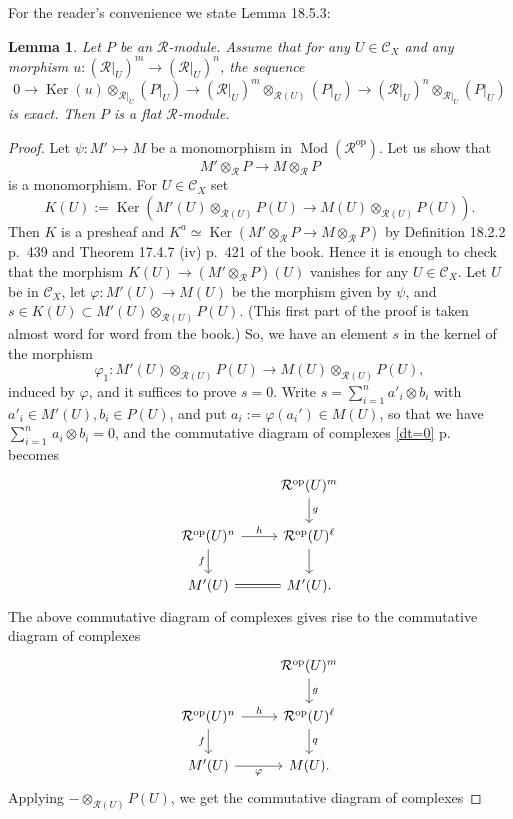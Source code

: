 \documentclass[12pt]{article}%
\newtheorem{lem}[thm]{Lemma}
\theoremstyle{remark}
\theoremstyle{definition}
\newcommand{\cc}{\mathcal}
\newcommand{\C}{\mathcal C}
\newcommand{\pp}{\varphi}
\newcommand{\mono}{\rightarrowtail}%
\DeclareMathOperator{\Ker}{Ker}
\DeclareMathOperator{\Mod}{Mod}
\DeclareMathOperator{\op}{op}
\begin{document}
For the reader's convenience we state Lemma 18.5.3: 
%
\begin{lem}\label{l1853}
Let $P$ be an $\cc R$-module. Assume that for any $U\in\C_X$ and any morphism $u:(\cc R|_U)^m\to(\cc R|_U)^n$, the sequence 
$$
0\to\Ker(u)\otimes_{\cc R|_U}(P|_U)\to(\cc R|_U)^m\otimes_{\cc R(U)}(P|_U)\to(\cc R|_U)^n\otimes_{\cc R|_U}(P|_U)
$$ 
is exact. Then $P$ is a flat $\cc R$-module.
\end{lem}
%
\begin{proof}
Let $\psi:M'\mono M$ be a monomorphism in $\Mod(\cc R^{\op})$. Let us show that 
$$
M'\otimes_{\cc R}P\to M\otimes_{\cc R}P
$$ 
is a monomorphism. For $U\in\C_X$ set 
$$
K(U):=\Ker\left(M'(U)\otimes_{\cc R(U)}P(U)\to M(U)\otimes_{\cc R(U)}P(U)\right).
$$ 
Then $K$ is a presheaf and $K^a\simeq\Ker(M'\otimes_{\cc R}P\to M\otimes_{\cc R}P)$ by Definition 18.2.2 p.~439 and Theorem 17.4.7 (iv) p.~421 of the book. Hence it is enough to check that the morphism $K(U)\to(M'\otimes_{\cc R}P)(U)$ vanishes for any $U\in\C_X$. Let $U$ be in $\C_X$, let $\pp:M'(U)\to M(U)$ be the morphism given by $\psi$, and $s\in K(U)\subset M'(U)\otimes_{\cc R(U)}P(U)$. (This first part of the proof is taken almost word for word from the book.) So, we have an element $s$ in the kernel of the morphism 
$$
\varphi_1:M'(U)\otimes_{\cc R(U)}P(U)\to M(U)\otimes_{\cc R(U)}P(U),
$$ 
induced by $\pp$, and it suffices to prove $s=0$. Write $s=\sum_{i=1}^na'_i\otimes b_i$ with $a'_i\in M'(U),b_i\in P(U)$, and put $a_i:=\varphi(a_i')\in M(U)$, so that we have $\sum_{i=1}^n\,a_i\otimes b_i=0$, and the commutative diagram of complexes \eqref{dt=0} p.~\pageref{dt=0} becomes 
$$
\begin{tikzcd}
{}&\cc R^{\op}(U)^m\ar{d}{g}\\ 
\cc R^{\op}(U)^n\ar{r}{h}\ar{d}[swap]{f}&\cc R^{\op}(U)^\ell\ar{d}\\ 
M'(U)\ar[equal]{r}&M'(U).
\end{tikzcd}
$$ 
The above commutative diagram of complexes gives rise to the commutative diagram of complexes
%
\begin{equation}\label{d447}
\begin{tikzcd}
{}&\cc R^{\op}(U)^m\ar{d}{g}\\ 
\cc R^{\op}(U)^n\ar{r}{h}\ar{d}[swap]{f}&\cc R^{\op}(U)^\ell\ar{d}{q}\\ 
M'(U)\ar{r}[swap]{\varphi}&M(U).
\end{tikzcd}
\end{equation}
%
Applying $-\otimes_{\cc R(U)}P(U)$, we get the commutative diagram of complexes

\end{proof}
\end{document}
